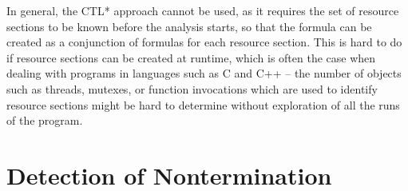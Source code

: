 In general, the CTL* approach cannot be used, as it requires the set of resource sections to be known before the analysis starts, so that the formula can be created as a conjunction of formulas for each resource section.
This is hard to do if resource sections can be created at runtime, which is often the case when dealing with programs in languages such as C and C++ -- the number of objects such as threads, mutexes, or function invocations which are used to identify resource sections might be hard to determine without exploration of all the runs of the program.

\section{Detection of Nontermination}\label{sec:detection}

